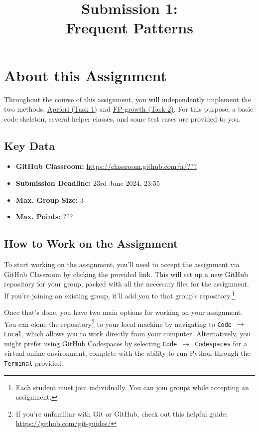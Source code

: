\documentclass[
english,
smallborders
]{i6prcsht}
\begin{document}
\title{Submission 1: \\ Frequent Patterns}
\maketitle
\vspace*{-2cm}

\section*{About this Assignment}

Throughout the course of this assignment, you will independently implement the two methods, \hyperref[sec:task-one]{Apriori (Task 1)} and \hyperref[sec:task-one]{FP-growth (Task 2)}. For this purpose, a basic code skeleton, several helper classes, and some test cases are provided to you.

\subsection*{Key Data}

\begin{itemize}
	\item \textbf{GitHub Classroom:} \url{https://classroom.github.com/a/???}
	\item \textbf{Submission Deadline:} 23rd June 2024, 23:55
	\item \textbf{Max. Group Size:} 3
	\item \textbf{Max. Points:} ???
\end{itemize}

\subsection*{How to Work on the Assignment}

To start working on the assignment, you'll need to accept the assignment via GitHub Classroom by clicking the provided link. This will set up a new GitHub repository for your group, packed with all the necessary files for the assignment. If you're joining an existing group, it'll add you to that group's repository.\footnote{Each student must join individually. You can join groups while accepting an assignment.}

Once that's done, you have two main options for working on your assignment. You can clone the repository\footnote{If you're unfamiliar with Git or GitHub, check out this helpful guide: \url{https://github.com/git-guides/}} to your local machine by navigating to \texttt{Code $\rightarrow$ Local}, which allows you to work directly from your computer. Alternatively, you might prefer using GitHub Codespaces by selecting \texttt{Code $\rightarrow$ Codespaces} for a virtual online environment, complete with the ability to run Python through the \texttt{Terminal} provided.
\end{document}

